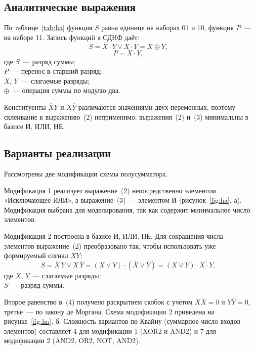 \documentclass[14pt,a4paper]{extarticle}
\newcommand{\inv}[1]{\overline{#1}}
\begin{document}
\subsection{Аналитические выражения}

По таблице~\ref{tab:ha} функция $S$ равна единице на наборах 01 и 10, функция $P$~--- на наборе 11. Запись функций в СДНФ даёт:
\begin{equation}
S = \inv{X} \cdot Y \vee X \cdot \inv{Y} = X \oplus Y,
\end{equation}
\begin{equation}
P = X \cdot Y,
\end{equation}
\noindent где $S$~--- разряд суммы;\\
$P$~--- перенос в старший разряд;\\
$X$, $Y$~--- слагаемые разряды;\\
$\oplus$~--- операция суммы по модулю два.

Конституенты $\inv{X} Y$ и $X \inv{Y}$ различаются значениями двух переменных, поэтому склеивание к выражению~(2) неприменимо; выражения~(2) и~(3) минимальны в базисе И, ИЛИ, НЕ.

\subsection{Варианты реализации}

Рассмотрены две модификации схемы полусумматора.

Модификация 1 реализует выражение~(2) непосредственно элементом «Исключающее ИЛИ», а выражение~(3)~--- элементом И (рисунок~\ref{fig:ha}, а). Модификация выбрана для моделирования, так как содержит минимальное число элементов.

Модификация 2 построена в базисе И, ИЛИ, НЕ. Для сокращения числа элементов выражение~(2) преобразовано так, чтобы использовать уже формируемый сигнал $X Y$:
\begin{equation}
S = \inv{X}\,Y \vee X\,\inv{Y} = (X \vee Y) \cdot (\inv{X} \vee \inv{Y}) = (X \vee Y) \cdot \inv{X \cdot Y},
\end{equation}
\noindent где $X$, $Y$~--- слагаемые разряды;\\
$S$~--- разряд суммы.

Второе равенство в~(4) получено раскрытием скобок с учётом $X \inv{X} = 0$ и $Y \inv{Y} = 0$, третье~--- по закону де Моргана. Схема модификации 2 приведена на рисунке~\ref{fig:ha}, б. Сложность вариантов по Квайну (суммарное число входов элементов) составляет 4 для модификации 1 (XOR2 и AND2) и 7 для модификации 2 (AND2, OR2, NOT, AND2).
\end{document}

